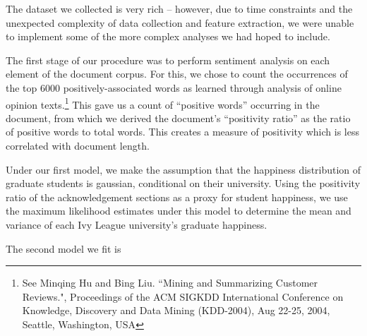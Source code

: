 The dataset we collected is very rich -- however, due to time constraints and the unexpected complexity of data collection and feature extraction, we were unable to implement some of the more complex analyses we had hoped to include.

The first stage of our procedure was to perform sentiment analysis on each element of the document corpus. For this, we chose to count the occurrences of the top 6000 positively-associated words as learned through analysis of online opinion texts.\footnote{See Minqing Hu and Bing Liu. ``Mining and Summarizing Customer Reviews.", Proceedings of the ACM SIGKDD International Conference on Knowledge, Discovery and Data Mining (KDD-2004), Aug 22-25, 2004, Seattle, Washington, USA} This gave us a count of ``positive words'' occurring in the document, from which we derived the document's ``positivity ratio'' as the ratio of positive words to total words. This creates a measure of positivity which is less correlated with document length.

Under our first model, we make the assumption that the happiness distribution of graduate students is gaussian, conditional on their university. Using the positivity ratio of the acknowledgement sections as a proxy for student happiness, we use the maximum likelihood estimates under this model to determine the mean and variance of each Ivy League university's graduate happiness.

The second model we fit is 